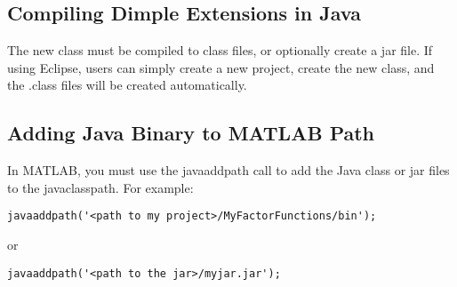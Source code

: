 \ifmatlab

\subsection{Compiling Dimple Extensions in Java}

The new class must be compiled to class files, or optionally create a jar file. If using Eclipse, users can simply create a new project, create the new class, and the .class files will be created automatically.


\subsection{Adding Java Binary to MATLAB Path}

In MATLAB, you must use the javaaddpath call to add the Java class or jar files to the javaclasspath.  For example:

\begin{lstlisting}
javaaddpath('<path to my project>/MyFactorFunctions/bin');
\end{lstlisting}

or

\begin{lstlisting}
javaaddpath('<path to the jar>/myjar.jar');
\end{lstlisting}

\fi